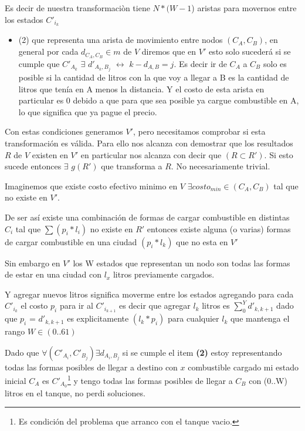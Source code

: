 \documentclass[12pt]{article}
\begin{document}
Es decir de nuestra transformaciòn tiene  $N * (W - 1$) aristas para movernos entre los estados $C'_{i_k}$

\begin{itemize}
	\item (2) que representa una arista de movimiento entre nodos $(C_A, C_B)$, en general por cada $d_{C_A,C_B} \in m$ de $V$ diremos que en $V'$ esto solo sucederá si se cumple que $C'_{A_k}$ $\exists$ $d'_{A_k,B_j}$ $\leftrightarrow$  $k - d_{A,B} = j$. Es decir ir de $C_A$ a $C_B$ solo es posible si la cantidad de litros con la que voy a llegar a B es la cantidad de litros que tenía en A menos la distancia. Y el costo de esta arista en particular es $0$ debido a que para que sea posible ya cargue combustible en A, lo que significa que ya pague el precio.
\end{itemize}

Con estas condiciones generamos $V'$, pero necesitamos comprobar si esta transformación es válida. Para ello nos alcanza con demostrar que los resultados $R$ de $V$ existen en $V'$ en particular nos alcanza con decir que $(R \subset R')$. Si esto sucede entonces $\exists$ $g(R')$ que transforma a $R$. No necesariamente trivial.

Imaginemos que existe costo efectivo minimo en $V$  $\exists costo_{min} \in (C_A,C_B)$ tal que no existe en $V'$.

De ser así existe una combinación de formas de cargar combustible en distintas $C_i$ tal que $\sum (p_i * l_i)$ no existe en $R'$ entonces existe alguna (o varias) formas de cargar combustible en una ciudad $(p_i * l_k)$ que no esta en $V'$

Sin embargo en $V'$ los W estados que representan un nodo son todas las formas de estar en una ciudad con $l_x$ litros previamente cargados.

Y agregar nuevos litros significa moverme entre los estados agregando para cada $C'_{i_k}$ el costo $p_i$ para ir al $C'_{i_{k+1}}$ es decir que agregar $l_k$ litros es $\sum_0^Y d'_{k,k+1}$ dado que $p_i$ = $d'_{k,k+1}$ es explicitamente $(l_k * p_i)$ para cualquier $l_k$ que mantenga el rango $W \in (0..61)$

Dado que $\forall (C'_{A_i}, C'_{B_j}) \exists d_{A_i,B_j}$ si se cumple el item \textbf{(2)} estoy representando todas las formas posibles de llegar a destino con $x$ combustible cargado mi estado inicial $C_A$ es $C'_{A_0}$\footnote{Es condición del problema que arranco con el tanque vacio.} y tengo todas las formas posibles de llegar a $C_{B}$ con (0..W) litros en el tanque, no perdi soluciones.
\end{document}
